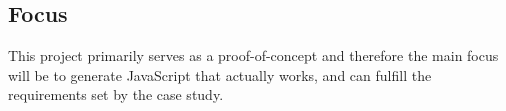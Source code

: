 





	\subsection{Focus} %
	\label{sub:focus}
		This project primarily serves as a proof-of-concept and therefore the main focus will be to generate JavaScript that actually works, and can fulfill the requirements set by the case study. 

